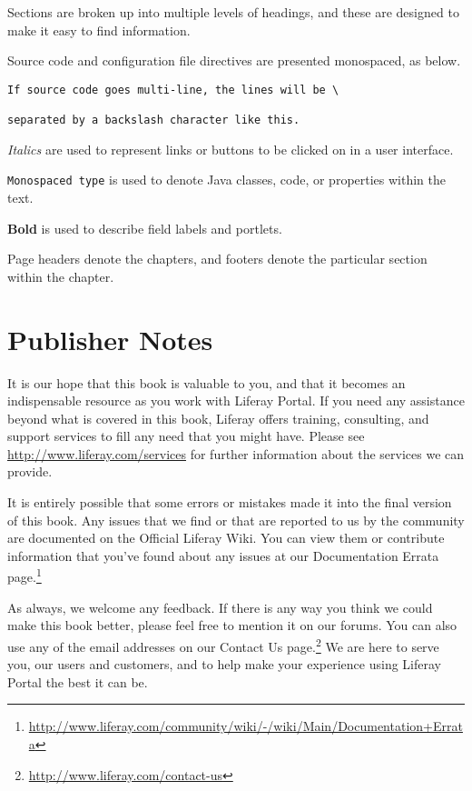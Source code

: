 \documentclass[9pt,openright,twoside]{memoir}
\begin{document}
Sections are broken up into multiple levels of headings, and these are
designed to make it easy to find information.

Source code and configuration file directives are presented monospaced, as
below.

\begin{verbatim}
If source code goes multi-line, the lines will be \

separated by a backslash character like this.

\end{verbatim}

\textit{Italics} are used to represent links or buttons to be clicked on in a
user interface.

\texttt{Monospaced type} is used to denote Java classes, code, or properties
within the text.

\textbf{Bold} is used to describe field labels and portlets.

Page headers denote the chapters, and footers denote the particular
section within the chapter.

\section{Publisher Notes}

It is our hope that this book is valuable to you, and that it becomes an
indispensable resource as you work with Liferay Portal. If you need any
assistance beyond what is covered in this book, Liferay  offers training,
consulting, and support services to fill any need that you might have. Please
see \href{http://www.liferay.com/services}{http://www.liferay.com/services} for
further information about the services we can provide.

It is entirely possible that some errors or mistakes made it into the final
version of this book. Any issues that we find or that are reported to us by the
community are documented on the Official Liferay Wiki. You can view them or
contribute information that you've found about any issues at our Documentation
Errata
page.\footnote{\href{http://www.liferay.com/community/wiki/-/wiki/Main/Documentation+Errata}{http://www.liferay.com/community/wiki/-/wiki/Main/Documentation+Errata}} 

As always, we welcome any feedback. If there is any way you think we
could make this book better, please feel free to mention it on our
forums. You can also use any of the email addresses on our Contact Us
page.\footnote{\href{http://www.liferay.com/contact-us}{http://www.liferay.com/contact-us}}
We are here to serve you, our users and customers, and to help make your
experience using Liferay Portal the best it can be.

\mainmatter

\pagestyle{headings}
\end{document}
